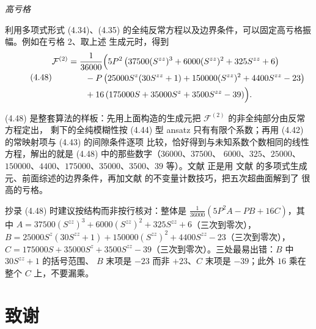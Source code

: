 
\medskip
\noindent\emph{高亏格}\par

利用多项式形式 (4.34)、(4.35) 的全纯反常方程以及边界条件，可以固定高亏格振幅。例如在亏格 2、取上述
生成元时，得到
\begin{equation}\tag{4.48}
\begin{aligned}
\mathcal{F}^{(2)}
&= \frac{1}{36000}\Bigl(
  5P^2\left(37500(S^{zz})^3 + 6000(S^{zz})^2 + 325S^{zz} + 6\right) \\
&\qquad - P\left(25000S^z(30S^{zz}+1) + 150000(S^{zz})^2 + 4400S^{zz} - 23\right) \\
&\qquad + 16\left(175000S + 35000S^z + 3500S^{zz} - 39\right)\Bigr).
\end{aligned}
\end{equation}

\begin{yizhu}[物理图像]
(4.48) 是整套算法的样板：先用上面构造的生成元把 $\mathcal{F}^{(2)}$ 的非全纯部分由反常方程定出，
剩下的全纯模糊性按 (4.44) 型 ansatz 只有有限个系数；再用 (4.42) 的常映射项与 (4.43) 的间隙条件逐项
比较，恰好得到与未知系数个数相同的线性方程，解出的就是 (4.48) 中的那些数字（$36000$、$37500$、
$6000$、$325$、$25000$、$150000$、$4400$、$175000$、$35000$、$3500$、$39$ 等）。文献 \cite{ref90} 正是用
文献 \cite{ref21} 的多项式生成元、前面综述的边界条件，再加文献 \cite{ref93} 的不变量计数技巧，把五次超曲面解到了
很高的亏格。
\end{yizhu}

\begin{yizhu}[易错点]
抄录 (4.48) 时建议按结构而非按行核对：整体是 $\frac{1}{36000}\left(5P^2A - PB + 16C\right)$，其中
$A=37500(S^{zz})^3+6000(S^{zz})^2+325S^{zz}+6$（三次到零次），
$B=25000S^z(30S^{zz}+1)+150000(S^{zz})^2+4400S^{zz}-23$（三次到零次），
$C=175000S+35000S^z+3500S^{zz}-39$（三次到零次）。三处最易出错：$B$ 中 $30S^{zz}+1$ 的括号范围、
$B$ 末项是 $-23$ 而非 $+23$、$C$ 末项是 $-39$；此外 $16$ 乘在整个 $C$ 上，不要漏乘。
\end{yizhu}

\section*{致谢}

